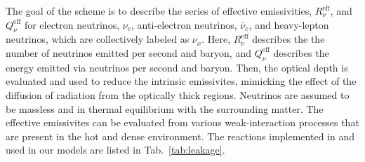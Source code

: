 %
The goal of the scheme is to describe the series of effective emissivities, 
$R_{\nu}^{\text{eff}}$, and $Q_{\nu}^{\text{eff}}$ for electron neutrinos, $\nu_e$, 
anti-electron neutrinos, $\bar{\nu}_e$, and heavy-lepton neutrinos, 
which are collectively labeled as $\nu_x$.
%
Here, $R_{\nu}^{\text{eff}}$ describes the the number of neutrinos emitted per second and baryon,
and $Q_{\nu}^{\text{eff}}$ describes the energy emitted via neutrinos per second and baryon.
%
Then, the optical depth is evaluated and used to reduce the intrinsic emissivites, 
mimicking the effect of the diffusion of radiation from the optically thick regions.
%
%
Neutrinos are assumed to be massless and in thermal equilibrium with the surrounding matter.
%
%
The effective emissivites can be evaluated from various 
weak-interaction processes that are present in the hot and dense \pmerg{} environment. 
%
The reactions implemented in \wisky{} and used in our models are 
listed in Tab.~\ref{tab:leakage}. 
%

